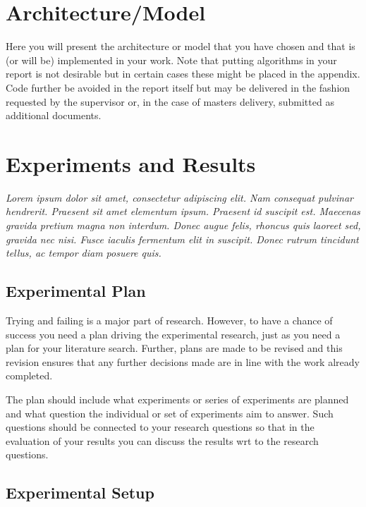 \documentclass[a4paper]{book}
\begin{document}
\chapter{Architecture/Model}
\label{sec:architectureAndModel}

Here you will present the architecture or model that you have chosen and that is (or will be) implemented in your work. Note that putting algorithms in your report is not desirable but in certain cases these might be placed in the appendix. Code further be avoided in the report itself but may be delivered in the fashion requested by the supervisor or, in the case of masters delivery, submitted as additional documents.

\chapter{Experiments and Results}
\label{cha:ResearchAndResults}

{\it Lorem ipsum dolor sit amet, consectetur adipiscing elit. Nam consequat pulvinar hendrerit. Praesent sit amet elementum ipsum. Praesent id suscipit est. Maecenas gravida pretium magna non interdum. Donec augue felis, rhoncus quis laoreet sed, gravida nec nisi. Fusce iaculis fermentum elit in suscipit. Donec rutrum tincidunt tellus, ac tempor diam posuere quis. }

\section{Experimental Plan}
\label{sec:experimentalPlan}

Trying and failing is a major part of research. However, to have a chance of success you need a plan driving the experimental research, just as you need a plan for your literature search. Further, plans are made to be revised and this revision ensures that any further decisions made are in line with the work already completed.

The plan should include what experiments or series of experiments are planned and what question the individual or set of experiments aim to answer. Such questions should be connected to your research questions so that in the evaluation of your results you can discuss the results wrt to the research questions.

\section{Experimental Setup}
\label{sec:experimentalSetup}
\end{document}
